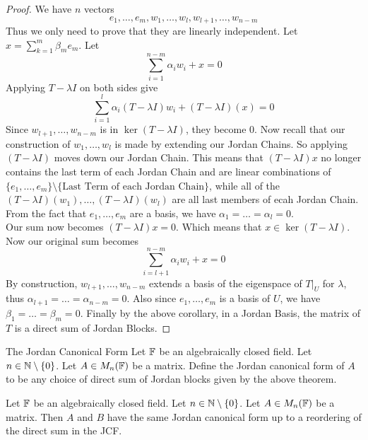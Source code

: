 \documentclass[a4paper]{article}
\begin{document}
\begin{thm}{}{}
\begin{proof}
We have $n$ vectors $$e_1,\dots,e_m,w_1,\dots,w_l,w_{l+1},\dots,w_{n-m}$$ Thus we only need to prove that they are linearly independent. Let $x=\sum_{k=1}^m\beta_me_m$. Let $$\sum_{i=1}^{n-m}\alpha_iw_i+x=0$$ Applying $T-\lambda I$ on both sides give $$\sum_{i=1}^{l}\alpha_i(T-\lambda I)w_i+(T-\lambda I)(x)=0$$ Since $w_{l+1},\dots,w_{n-m}$ is in $\ker(T-\lambda I)$, they become $0$. Now recall that our construction of $w_1,\dots,w_l$ is made by extending our Jordan Chains. So applying $(T-\lambda I)$ moves down our Jordan Chain. This means that $(T-\lambda I)x$ no longer contains the last term of each Jordan Chain and are linear combinations of $\{e_1,\dots,e_m\}\setminus\{\text{Last Term of each Jordan Chain}\}$, while all of the $(T-\lambda I)(w_1),\dots,(T-\lambda I)(w_l)$ are all last members of ecah Jordan Chain. From the fact that $e_1,\dots,e_m$ are a basis, we have $\alpha_1=\dots=\alpha_l=0$. \\
Our sum now becomes $(T-\lambda I)x=0$. Which means that $x\in\ker(T-\lambda I)$. Now our original sum becomes $$\sum_{i=l+1}^{n-m}\alpha_iw_i+x=0$$ By construction, $w_{l+1},\dots,w_{n-m}$ extends a basis of the eigenspace of $T|_U$ for $\lambda$, thus $\alpha_{l+1}=\dots=\alpha_{n-m}=0$. Also since $e_1,\dots,e_m$ is a basis of $U$, we have $\beta_1=\dots=\beta_m=0$. 
Finally by the above corollary, in a Jordan Basis, the matrix of $T$ is a direct sum of Jordan Blocks. 
\end{proof}
\end{thm}

\begin{defn}{The Jordan Canonical Form}{} Let $\mathbb{F}$ be an algebraically closed field. Let $n\in\mathbb{N}\setminus\{0\}$. Let $A\in M_n(\mathbb{F})$ be a matrix. Define the Jordan canonical form of $A$ to be any choice of direct sum of Jordan blocks given by the above theorem. 
\end{defn}

\begin{lmm}{}{} Let $\mathbb{F}$ be an algebraically closed field. Let $n\in\mathbb{N}\setminus\{0\}$. Let $A\in M_n(\mathbb{F})$ be a matrix. Then $A$ and $B$ have the same Jordan canonical form up to a reordering of the direct sum in the JCF. 
\end{lmm}
\end{document}

